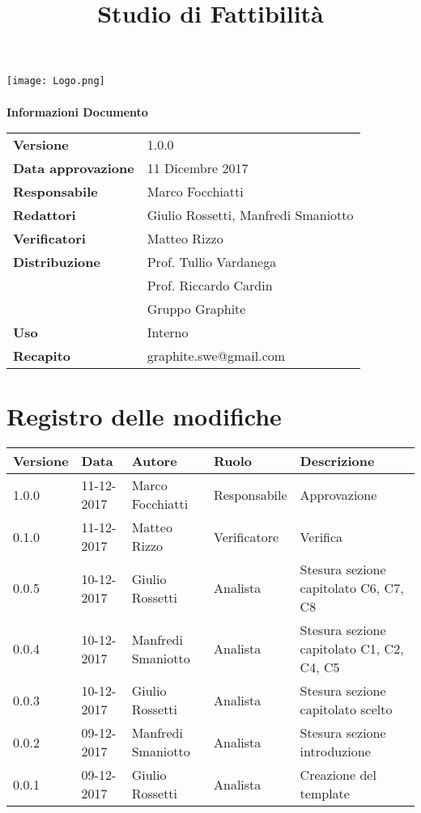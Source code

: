 \documentclass[openany,12pt,a4paper]{report}
\title{Studio di Fattibilità}
\author{}
\newcommand{\versione}{1.0.0}
\begin{document}
	\makeatletter
	\begin{titlepage}
		\setlength{\headsep}{0pt}
		\begin{center}
			\texttt{[image: Logo.png]}\\[1em]
			{\huge \bfseries  \@title }\\[10ex]
			\textbf{\Large Informazioni Documento} \\[2em]
			\bgroup
			\def\arraystretch{1.5}
			\begin{tabular}{l|l}
				\textbf{Versione} & \versione{} \\
				\textbf{Data approvazione} & 11 Dicembre 2017 \\
				\textbf{Responsabile} & Marco Focchiatti \\
				\textbf{Redattori} & Giulio Rossetti, Manfredi Smaniotto \\
				\textbf{Verificatori} & Matteo Rizzo \\
				\textbf{Distribuzione} & Prof. Tullio Vardanega \\
				& Prof. Riccardo Cardin \\
				& Gruppo Graphite \\
				\textbf{Uso} & Interno \\
				\textbf{Recapito} & graphite.swe@gmail.com \\
			\end{tabular}
			\egroup
		\end{center}
	\end{titlepage}
	\makeatother

	\thispagestyle{empty}
	\newpage
	
	
	\chapter*{Registro delle modifiche}
	\setlength\LTleft{-22mm}
	\begin{longtable}{|p{20mm}|p{20mm}|p{40mm}|p{30mm}|p{50mm}|}
		\hline
		\textbf{Versione} & \textbf{Data} & \textbf{Autore} & \textbf{Ruolo} & \textbf{Descrizione} \\ \hline 
			1.0.0 & 11-12-2017 & Marco Focchiatti & Responsabile & Approvazione\\ \hline
			0.1.0 & 11-12-2017 & Matteo Rizzo & Verificatore & Verifica\\ \hline
			0.0.5 & 10-12-2017 & Giulio Rossetti & Analista & Stesura sezione
			capitolato C6, C7, C8\\ \hline
			0.0.4 & 10-12-2017 & Manfredi Smaniotto & Analista & Stesura sezione
			capitolato C1, C2, C4, C5\\ \hline
			0.0.3 & 10-12-2017 & Giulio Rossetti & Analista & Stesura sezione capitolato scelto\\ \hline
			0.0.2 & 09-12-2017 & Manfredi Smaniotto & Analista & Stesura sezione introduzione\\ \hline
			0.0.1 & 09-12-2017 & Giulio Rossetti & Analista & Creazione del template\\ \hline	
		\end{longtable}
\end{document}
